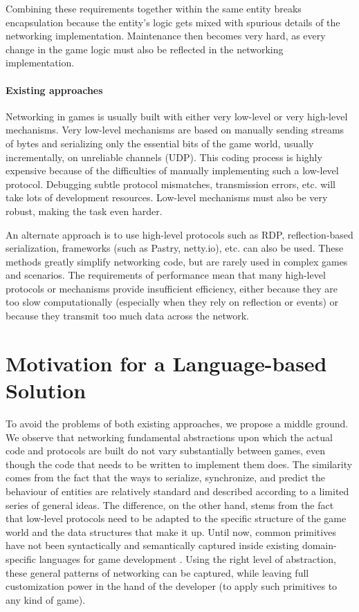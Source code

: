 Combining these requirements together within the same entity breaks encapsulation because the entity's logic gets mixed with spurious details of the networking implementation. Maintenance then becomes very hard, as every change in the game logic must also be reflected in the networking implementation.

\paragraph{Existing approaches}
Networking in games is usually built with either very low-level or very high-level mechanisms. Very low-level mechanisms are based on manually sending streams of bytes and serializing only the essential bits of the game world, usually incrementally, on unreliable channels (UDP). This coding process is highly expensive because of the difficulties of manually implementing such a low-level protocol. Debugging subtle protocol mismatches, transmission errors, etc. will take lots of development resources. Low-level mechanisms must also be very robust, making the task even harder.

An alternate approach is to use high-level protocols such as RDP, reflection-based serialization, frameworks (such as Pastry, netty.io), etc. can also be used. These methods greatly simplify networking code, but are rarely used in complex games and scenarios. The requirements of performance mean that many high-level protocols or mechanisms provide insufficient efficiency, either because they are too slow computationally (especially when they rely on reflection or events) or because they transmit too much data across the network.

\section{Motivation for a Language-based Solution}

To avoid the problems of both existing approaches, we propose a middle ground. We observe that networking fundamental abstractions upon which the actual code and protocols are built do not vary substantially between games, even though the code that needs to be written to implement them does. The similarity comes from the fact that the ways to serialize, synchronize, and predict the behaviour of entities are relatively standard and described according to a limited series of general ideas. The difference, on the other hand, stems from the fact that low-level protocols need to be adapted to the specific structure of the game world and the data structures that make it up. Until now, common primitives have not been syntactically and semantically captured inside existing domain-specific languages for game development \cite{bhatti2009domain}. Using the right level of abstraction, these general patterns of networking can be captured, while leaving full customization power in the hand of the developer (to apply such primitives to any kind of game).

